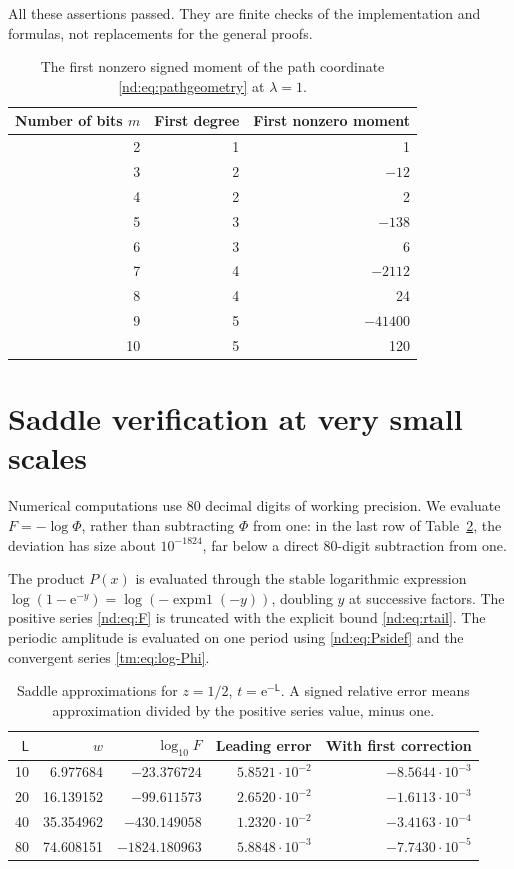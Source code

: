 \documentclass[11pt,a4paper,oneside,openany]{book}
\numberwithin{equation}{chapter}
\theoremstyle{definition}
\theoremstyle{remark}
\newcommand{\e}{\mathrm e}
\newcommand{\Lsad}{\mathsf L}
\begin{document}
All these assertions passed. They are finite checks of the implementation and
formulas, not replacements for the general proofs.

\begin{table}[htbp]
\centering
\caption{The first nonzero signed moment of the path coordinate
\eqref{nd:eq:pathgeometry} at \(\lambda=1\).}
\label{nd:tab:path}
\begin{tabular}{@{}rrr@{}}
\toprule
Number of bits \(m\)&First degree&First nonzero moment\\
\midrule
2&1&1\\
3&2&\(-12\)\\
4&2&2\\
5&3&\(-138\)\\
6&3&6\\
7&4&\(-2112\)\\
8&4&24\\
9&5&\(-41400\)\\
10&5&120\\
\bottomrule
\end{tabular}
\end{table}

\section{Saddle verification at very small scales}
Numerical computations use 80 decimal digits of working precision. We evaluate
\(F=-\log\Phi\), rather than subtracting \(\Phi\) from one: in the last row
of Table~\ref{nd:tab:saddle}, the deviation has size about \(10^{-1824}\), far
below a direct 80-digit subtraction from one.

The product \(P(x)\) is evaluated through the stable logarithmic expression
\(\log(1-\e^{-y})=\log(-\operatorname{expm1}(-y))\), doubling \(y\) at
successive factors. The positive series \eqref{nd:eq:F} is truncated with the
explicit bound \eqref{nd:eq:rtail}. The periodic amplitude is evaluated on one
period using \eqref{nd:eq:Psidef} and the convergent series \eqref{tm:eq:log-Phi}.

\begin{table}[htbp]
\centering
\small
\caption{Saddle approximations for \(z=1/2\), \(t=\e^{-\Lsad}\). A signed
relative error means approximation divided by the positive series value,
minus one.}
\label{nd:tab:saddle}
\begin{tabular}{@{}rrrrr@{}}
\toprule
\(\Lsad\)&\(w\)&\(\log_{10}F\)&Leading error&With first correction\\
\midrule
10&6.977684&\(-23.376724\)&\(5.8521\cdot10^{-2}\)&\(-8.5644\cdot10^{-3}\)\\
20&16.139152&\(-99.611573\)&\(2.6520\cdot10^{-2}\)&\(-1.6113\cdot10^{-3}\)\\
40&35.354962&\(-430.149058\)&\(1.2320\cdot10^{-2}\)&\(-3.4163\cdot10^{-4}\)\\
80&74.608151&\(-1824.180963\)&\(5.8848\cdot10^{-3}\)&\(-7.7430\cdot10^{-5}\)\\
\bottomrule
\end{tabular}
\end{table}
\end{document}
